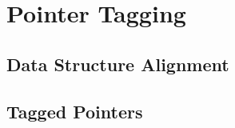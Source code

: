 \section{Pointer Tagging}
\label{sec:preliminaries:pointertagging}


\subsection{Data Structure Alignment}

\subsection{Tagged Pointers}